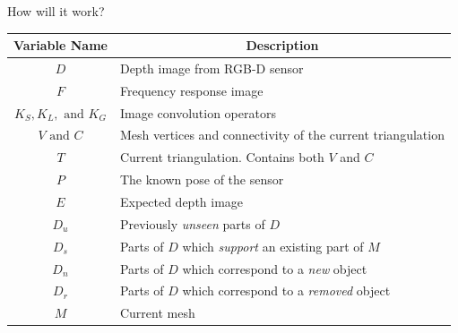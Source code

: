 \documentclass{beamer}
\begin{document}
\begin{frame}{How will it work?}
\vspace{-.2in}
  \begin{center}
\begin{table}[h]
\begin{footnotesize}
\begin{center}
\begin{tabular}{|c|l|}
\hline
{\bf Variable Name} & \multicolumn{1}{|c|}{{\bf Description}} \\
\hline
\rowcolor{LightGray} $D$ & Depth image from RGB-D sensor \\ 
$F$ & Frequency response image \\
\rowcolor{LightGray} $K_S,K_L,\text{ and }K_G$ & Image convolution operators \\
$V \text{ and } C$ & Mesh vertices and connectivity of the current triangulation \\
\rowcolor{LightGray} $T$ & Current triangulation. Contains both $V$ and $C$ \\
$P$ & The known pose of the sensor \\
\rowcolor{LightGray} $E$ & Expected depth image \\ 
$D_u$ & Previously \emph{unseen} parts of $D$ \\ 
\rowcolor{LightGray} $D_s$ & Parts of $D$ which \emph{support} an existing part of
$M$ \\ 
$D_n$ & Parts of $D$ which correspond to a \emph{new} object \\ 
\rowcolor{LightGray} $D_r$ & Parts of $D$ which correspond to a
\emph{removed} object \\ 
$M$ & Current mesh \\
\hline
\end{tabular}
\end{center}
\label{tab:var}
\end{footnotesize}
\end{table}
  \end{center}
\end{frame}
\end{document}
